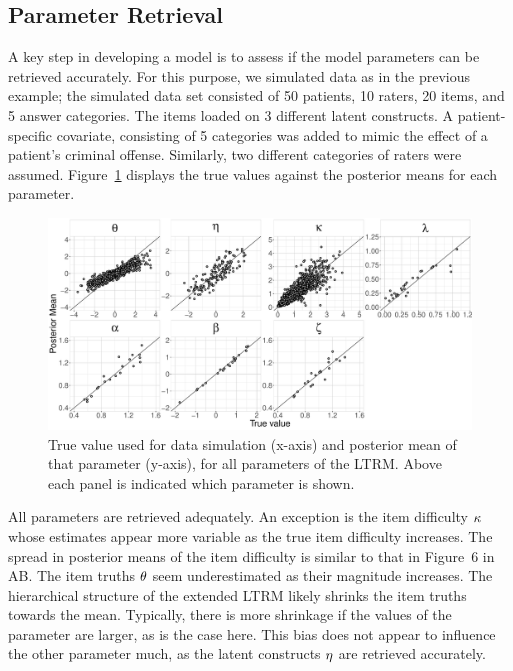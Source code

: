 \documentclass[a4paper]{article}
\newcommand{\AB}{AB}
\begin{document}
\subsection*{Parameter Retrieval}
A key step in developing a model is to assess if the model parameters can be retrieved accurately. For this purpose, we simulated data as in the previous example; the simulated data set consisted of 50 patients, 10 raters, 20 items, and 5 answer categories. The items loaded on 3 different latent constructs. A patient-specific covariate, consisting of 5 categories was added to mimic the effect of a patient's criminal offense. Similarly, two different categories of raters were assumed. Figure~\ref{fig:parameterRecoveryELTRM} displays the true values against the posterior means for each parameter.

\begin{figure}[!ht]
	\centering
	\includegraphics[width= \textwidth]{figures/parameterRecoveryModel2.pdf}
	\caption{True value used for data simulation (x-axis) and posterior mean of that parameter (y-axis), for all parameters of the LTRM. Above each panel is indicated which parameter is shown.}
	\label{fig:parameterRecoveryELTRM}
\end{figure}

All parameters are retrieved adequately. An exception is the item difficulty $\kappa$ whose estimates appear more variable as the true item difficulty increases. The spread in posterior means of the item difficulty is similar to that in Figure~6 in \AB{}. The item truths $\theta$ seem underestimated as their magnitude increases. The hierarchical structure of the extended LTRM likely shrinks the item truths towards the mean. Typically, there is more shrinkage if the values of the parameter are larger, as is the case here. This bias does not appear to influence the other parameter much, as the latent constructs $\eta$ are retrieved accurately. %
\end{document}

